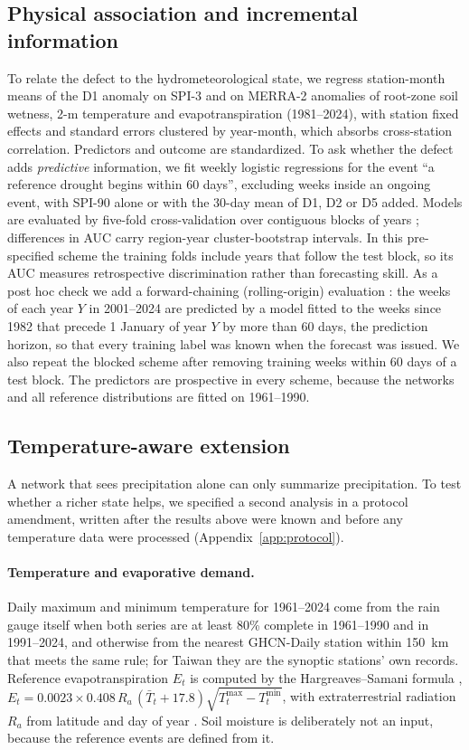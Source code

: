 \documentclass[pdflatex,sn-mathphys-ay]{sn-jnl}
\theoremstyle{thmstyletwo}
\begin{document}
\subsection{Physical association and incremental information}\label{sec:physical_methods}
To relate the defect to the hydrometeorological state, we regress station-month means of the D1 anomaly on SPI-3 and on MERRA-2 anomalies of
root-zone soil wetness, 2-m temperature and evapotranspiration (1981--2024), with station fixed effects
and standard errors clustered by year-month, which absorbs cross-station correlation. Predictors and
outcome are standardized. To ask whether the defect adds \emph{predictive} information, we fit weekly
logistic regressions for the event ``a reference drought begins within 60 days'', excluding weeks inside
an ongoing event, with SPI-90 alone or with the 30-day mean of D1, D2 or D5 added. Models are evaluated
by five-fold cross-validation over contiguous blocks of years \citep{roberts2017}; differences in AUC
carry region-year cluster-bootstrap intervals. In this pre-specified scheme the training folds include
years that follow the test block, so its AUC measures retrospective discrimination rather than
forecasting skill. As a post hoc check we add a forward-chaining (rolling-origin) evaluation
\citep{tashman2000}: the weeks of each year $Y$ in 2001--2024 are predicted by a model fitted to the weeks
since 1982 that precede 1 January of year $Y$ by more than 60 days, the prediction horizon, so that every
training label was known when the forecast was issued. We also repeat the blocked scheme after removing
training weeks within 60 days of a test block. The predictors are prospective in every scheme, because
the networks and all reference distributions are fitted on 1961--1990.

\subsection{Temperature-aware extension}\label{sec:mv_methods}
A network that sees precipitation alone can only summarize precipitation. To test whether a richer state
helps, we specified a second analysis in a protocol amendment, written after the results above were known
and before any temperature data were processed (Appendix~\ref{app:protocol}).

\paragraph{Temperature and evaporative demand.} Daily maximum and minimum temperature for 1961--2024 come
from the rain gauge itself when both series are at least 80\% complete in 1961--1990 and in 1991--2024,
and otherwise from the nearest GHCN-Daily station within 150~km that meets the same rule; for Taiwan they
are the synoptic stations' own records. Reference evapotranspiration $E_t$ is computed by the
Hargreaves--Samani formula \citep{hargreaves1985},
$E_t=0.0023\times0.408\,R_a\,(\bar T_t+17.8)\sqrt{T^{\max}_t-T^{\min}_t}$, with extraterrestrial radiation
$R_a$ from latitude and day of year \citep{allen1998}. Soil moisture is deliberately not an input, because
the reference events are defined from it.
\end{document}
